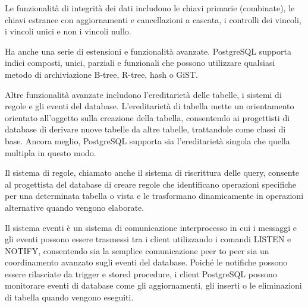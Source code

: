 Le funzionalit\`{a} di integrit\`{a} dei dati includono le chiavi primarie (combinate), le chiavi estranee con aggiornamenti e cancellazioni a cascata, i controlli dei vincoli, i vincoli unici e non i vincoli nullo.

Ha anche una serie di estensioni e funzionalit\`{a} avanzate. PostgreSQL supporta indici composti, unici, parziali e funzionali che possono utilizzare qualsiasi metodo di archiviazione B-tree, R-tree, hash o GiST.


Altre funzionalit\`{a} avanzate includono l'ereditariet\`{a} delle tabelle, i sistemi di regole e gli eventi del database. L'ereditarietà di tabella mette un orientamento orientato all'oggetto sulla creazione della tabella, consentendo ai progettisti di database di derivare nuove tabelle da altre tabelle, trattandole come classi di base. Ancora meglio, PostgreSQL supporta sia l'ereditarietà singola che quella multipla in questo modo.

Il sistema di regole, chiamato anche il sistema di riscrittura delle query, consente al progettista del database di creare regole che identificano operazioni specifiche per una determinata tabella o vista e le trasformano dinamicamente in operazioni alternative quando vengono elaborate.

Il sistema eventi è un sistema di comunicazione interprocesso in cui i messaggi e gli eventi possono essere trasmessi tra i client utilizzando i comandi LISTEN e NOTIFY, consentendo sia la semplice comunicazione peer to peer sia un coordinamento avanzato sugli eventi del database. Poiché le notifiche possono essere rilasciate da trigger e stored procedure, i client PostgreSQL possono monitorare eventi di database come gli aggiornamenti, gli inserti o le eliminazioni di tabella quando vengono eseguiti.



